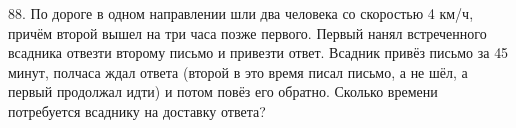 88. По дороге в одном направлении шли два человека со скоростью 4 км/ч, причём второй вышел на три часа позже первого. Первый нанял встреченного всадника отвезти второму письмо и привезти ответ. Всадник привёз письмо за 45 минут, полчаса ждал ответа (второй в это время писал письмо, а не шёл, а первый продолжал идти) и потом повёз его обратно. Сколько времени потребуется всаднику на доставку ответа?\\
